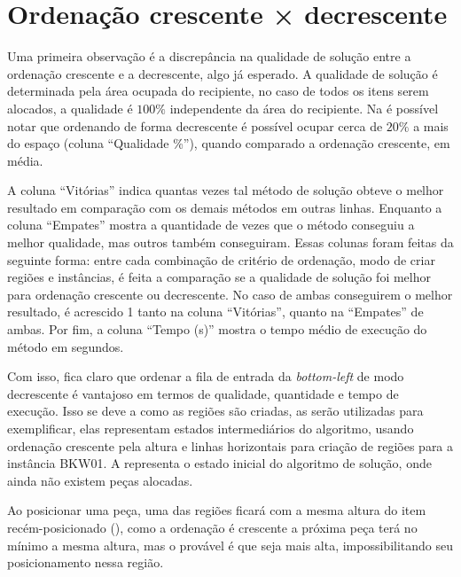 \section{Ordenação crescente × decrescente}\label{sec:ordenacao-crescente-decrescente}

Uma primeira observação é a discrepância na qualidade de solução entre a ordenação crescente
e a decrescente, algo já esperado.
A qualidade de solução é determinada pela área ocupada do recipiente, no caso de todos os itens
serem alocados, a qualidade é $100\%$ independente da área do recipiente.
Na  é possível notar que ordenando de forma decrescente é possível ocupar
cerca de $20\%$ a mais do espaço (coluna “Qualidade \%”), quando comparado a ordenação crescente,
em média.



A coluna “Vitórias” indica quantas vezes tal método de solução obteve o melhor resultado em
comparação com os demais métodos em outras linhas.
Enquanto a coluna “Empates” mostra a quantidade de vezes que o método conseguiu a melhor qualidade,
mas outros também conseguiram.
Essas colunas foram feitas da seguinte forma: entre cada combinação de critério de ordenação,
modo de criar regiões e instâncias, é feita a comparação se a qualidade de solução foi melhor
para ordenação crescente ou decrescente.
No caso de ambas conseguirem o melhor resultado, é acrescido 1 tanto na coluna “Vitórias”, quanto
na “Empates” de ambas.
Por fim, a coluna “Tempo (s)” mostra o tempo médio de execução do método em segundos.

Com isso, fica claro que ordenar a fila de entrada da \textit{bottom-left} de modo decrescente é
vantajoso em termos de qualidade, quantidade e tempo de execução.
Isso se deve a como as regiões são criadas,
as  serão utilizadas para exemplificar,
elas representam estados intermediários do algoritmo, usando ordenação crescente pela altura
e linhas horizontais para criação de regiões para a instância BKW01.
A  representa o estado inicial do algoritmo de solução, onde ainda
não existem peças alocadas.



Ao posicionar uma peça, uma das regiões ficará com a mesma altura do item recém-posicionado
(), como a ordenação é crescente a próxima peça terá no mínimo a mesma altura,
mas o provável é que seja mais alta, impossibilitando seu posicionamento nessa região.

